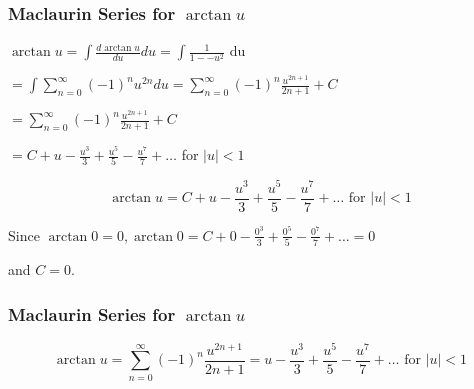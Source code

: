 \documentclass{beamer}
\begin{document}
\begin{frame}
\frametitle{Maclaurin Series for $\arctan u$}


$\displaystyle \arctan u = \int \frac{d \arctan u}{du} du=  \int \frac{1}{1--u^2} $ du \newline

\vspace{0.1 in}

$\displaystyle = \int \sum_{n=0}^\infty(-1)^n u^{2n} du= \sum_{n=0}^\infty (-1)^n  \frac{u^{2n+1}}{2n+1} + C $

\vspace{0.1 in}


$= \displaystyle \sum_{n=0}^\infty (-1)^n  \frac{u^{2n+1}}{2n+1} + C  $

\vspace{0.1 in}

$=\displaystyle C+  u - \frac{u^3}{3} + \frac{u^5}{5} - \frac{u^7}{7}+\dots$  for $|u| < 1$ 


\begin{equation}
	 \arctan u =C+  u - \frac{u^3}{3} + \frac{u^5}{5} - \frac{u^7}{7}+\dots  \textrm{ for  } |u| < 1
\end{equation}

Since $\arctan 0 = 0,  \arctan 0 =C+  0 - \frac{0^3}{3} + \frac{0^5}{5} - \frac{0^7}{7}+\dots =  0$

and $C=0$.

\vspace{6.5 cm}
\end{frame}





\begin{frame}
\frametitle{Maclaurin Series for $\arctan u$}


\begin{equation}
	 \arctan u = \sum_{n=0}^\infty (-1)^n  \frac{u^{2n+1}}{2n+1}= u - \frac{u^3}{3} + \frac{u^5}{5} - \frac{u^7}{7}+\dots  \textrm{ for  } |u| < 1
\end{equation}


\vspace{6.5 cm}
\end{frame}
\end{document}
